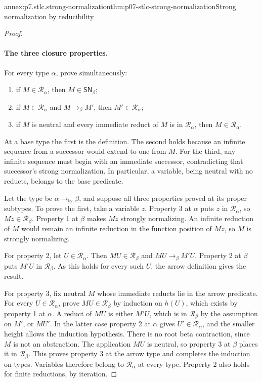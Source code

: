 \begin{annexitem}{annex:p7.stlc.strong-normalization}{thm:p07-stlc-strong-normalization}{Strong normalization by reducibility}
\begin{proof}
\paragraph{The three closure properties.}
For every type \(\alpha\), prove simultaneously:
\begin{enumerate}
 \item if \(M\in\mathcal R_\alpha\), then \(M\in\mathsf{SN}_\beta\);
 \item if \(M\in\mathcal R_\alpha\) and \(M\to_\beta M'\), then
       \(M'\in\mathcal R_\alpha\);
 \item if \(M\) is neutral and every immediate reduct of \(M\) is in
       \(\mathcal R_\alpha\), then \(M\in\mathcal R_\alpha\).
\end{enumerate}
At a base type the first is the definition. The second holds because an
infinite sequence from a successor would extend to one from \(M\).
For the third, any infinite sequence must begin with an immediate successor,
contradicting that successor's strong normalization. In particular, a variable,
being neutral with no reducts, belongs to the base predicate.

Let the type be \(\alpha\mathbin{\to_{\mathrm{ty}}}\beta\), and suppose
all three properties proved at its proper subtypes. To prove the first, take
a variable \(z\). Property 3 at \(\alpha\) puts \(z\) in
\(\mathcal R_\alpha\), so \(Mz\in\mathcal R_\beta\). Property 1 at
\(\beta\) makes \(Mz\) strongly normalizing. An infinite reduction of
\(M\) would remain an infinite reduction in the function position of
\(Mz\), so \(M\) is strongly normalizing.

For property 2, let \(U\in\mathcal R_\alpha\). Then
\(MU\in\mathcal R_\beta\) and \(MU\to_\beta M'U\).
Property 2 at \(\beta\) puts \(M'U\) in \(\mathcal R_\beta\).
As this holds for every such \(U\), the arrow definition gives the result.

For property 3, fix neutral \(M\) whose immediate reducts lie in the arrow
predicate. For every \(U\in\mathcal R_\alpha\), prove
\(MU\in\mathcal R_\beta\) by induction on \(h(U)\), which exists by
property 1 at \(\alpha\). A reduct of \(MU\) is either \(M'U\), which
is in \(\mathcal R_\beta\) by the assumption on \(M'\), or \(MU'\).
In the latter case property 2 at \(\alpha\) gives
\(U'\in\mathcal R_\alpha\), and the smaller height allows the induction
hypothesis. There is no root beta contraction, since \(M\) is not an
abstraction. The application \(MU\) is neutral, so property 3 at \(\beta\)
places it in \(\mathcal R_\beta\). This proves property 3 at the arrow
type and completes the induction on types. Variables therefore belong to
\(\mathcal R_\alpha\) at every type. Property 2 also holds for finite
reductions, by iteration.


\end{proof}
\end{annexitem}
